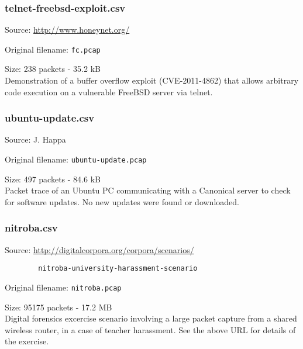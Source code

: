 \documentclass[12pt,a4paper]{article}
\newcommand{\dbl}{\\[\baselineskip]}
\begin{document}
	\subsubsection*{telnet-freebsd-exploit.csv}
	Source: \url{http://www.honeynet.org/}
	
	Original filename: \verb|fc.pcap|
	
	Size: 238 packets - 35.2 kB\dbl
	Demonstration of a buffer overflow exploit (CVE-2011-4862)
	that allows arbitrary code execution on a vulnerable
	FreeBSD server via telnet.
	
	\subsubsection*{ubuntu-update.csv}
	Source: J. Happa
	
	Original filename: \verb|ubuntu-update.pcap|
	
	Size: 497 packets - 84.6 kB\dbl
	Packet trace of an Ubuntu PC communicating with a Canonical
	server to check for software updates. No new updates were
	found or downloaded.
	
	\subsubsection*{nitroba.csv}
	Source: \url{http://digitalcorpora.org/corpora/scenarios/}
	
	\verb!        nitroba-university-harassment-scenario!
	
	Original filename: \verb|nitroba.pcap|
	
	Size: 95175 packets - 17.2 MB\dbl
	Digital forensics excercise scenario involving a large
	packet capture from a shared wireless router, in a case of
	teacher harassment. See the above URL for details of the
	exercise.
	
\end{document}

